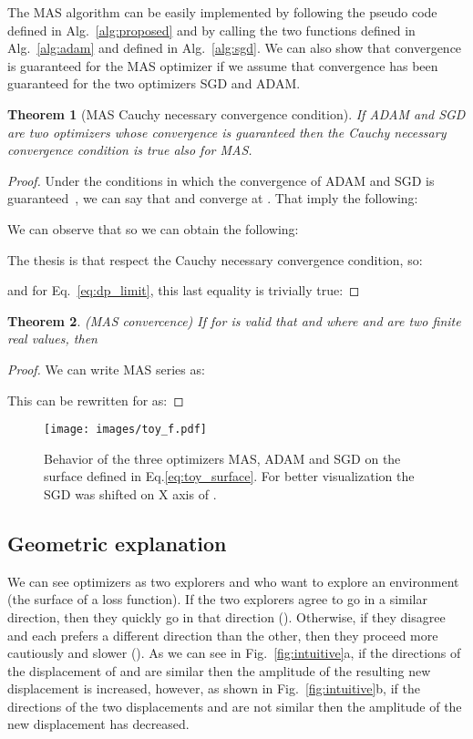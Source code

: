 \documentclass[10pt,twocolumn,letterpaper]{article}
\newtheorem{theorem}{Theorem}[section]
\begin{document}
The MAS algorithm can be easily implemented by following the pseudo code defined in Alg.~\ref{alg:proposed} and by calling the two functions  defined in Alg.~\ref{alg:adam} and  defined in Alg.~\ref{alg:sgd}.
We can also show that convergence is guaranteed for the MAS optimizer if we assume that convergence has been guaranteed for the two optimizers SGD and ADAM.

\begin{theorem}[MAS Cauchy necessary convergence condition]
\label{th:MAS_cauchy}
If ADAM and SGD are two optimizers whose convergence is guaranteed then the Cauchy necessary convergence condition is true also for MAS.
\end{theorem}


\begin{proof}
Under the conditions in which the convergence of ADAM and SGD is guaranteed~\cite{reddi2019convergence,lee2016gradient}, we can say that  and  converge at  . 
That imply the following:

We can observe that  so we can obtain the following:

The thesis is that 
 respect the Cauchy necessary convergence condition, so:
 
and for Eq.~\ref{eq:dp_limit}, this last equality is trivially true:


\end{proof}
\begin{theorem}
(MAS convercence)
If for  is valid that  and  where  and  are two finite real values,
then 
\end{theorem}
\begin{proof}
We can write MAS series as:

This can be rewritten for  as:


\end{proof}

\begin{figure}
    \centering
    \texttt{[image: images/toy\_f.pdf]}
    \caption{
Behavior of the three optimizers MAS, ADAM and SGD on the surface defined in Eq.\ref{eq:toy_surface}.
    For better visualization the SGD was shifted on X axis of .
    }
    \label{fig:toy}
\end{figure}

\subsection{Geometric explanation}
We can see optimizers as two explorers  and  who want to explore an environment (the surface of a loss function).
If the two explorers agree to go in a similar direction, then they quickly go in that direction ().
Otherwise, if they disagree and each prefers a different direction than the other, then they proceed more cautiously and slower ().
As we can see in Fig.~\ref{fig:intuitive}a, if the directions of the displacement of  and  are similar then the amplitude of the resulting new displacement  is increased, however,  as shown in Fig.~\ref{fig:intuitive}b, if the directions of the two displacements  and  are not similar then the amplitude of the new displacement  has decreased.
\end{document}
